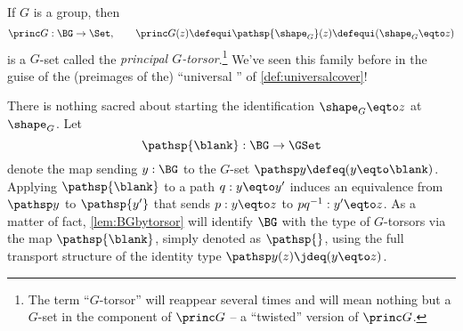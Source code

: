 \begin{example}\label{def:principaltorsor}
  If $G$ is a group, then
  \[
    \princ G:\BG\to\Set,
    \qquad\princ G(z)\defequi\pathsp{\shape_G}(z)\defequi(\shape_G \eqto z)
  \]
  is a $G$-set called the \emph{principal $G$-torsor}.\footnote{%
    The term ``$G$-torsor'' will reappear several times and will mean nothing but a $G$-set in the component of $\princ G$ -- a ``twisted'' version of $\princ G$.}
  We've seen this family before in the guise of the (preimages of the) ``universal \covering'' of \cref{def:universalcover}!

  There is nothing sacred about starting the identification
  $\shape_G \eqto z$ at $\shape_G$.
  Let
  \[
    \pathsp{\blank}:\BG\to\GSet
  \]
  denote the map sending $y:\BG$ to the $G$-set $\pathsp y\defeq(y\eqto\blank)$.
  Applying $\pathsp{\blank}$ to a path $q:y\eqto y'$
  induces an equivalence from $\pathsp y$ to $\pathsp {y'}$ that sends $p:y \eqto z$
  to $pq^{-1}:y'\eqto z$.
  As a matter of fact, \cref{lem:BGbytorsor} will identify $\BG$ with the type of
  $G$-torsors via the map $\pathsp{\blank}$, simply denoted as $\pathsp{}$,
  using the full transport structure of the identity type $\pathsp y(z)\jdeq(y \eqto z)$.
\end{example}

